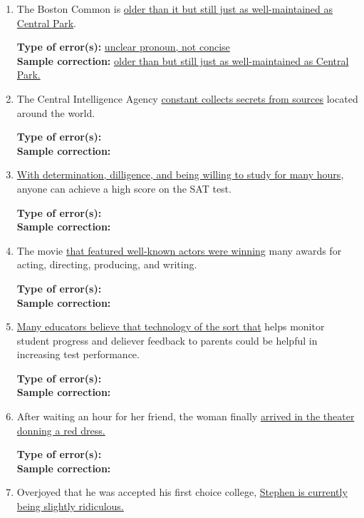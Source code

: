 \begin{enumerate}
\item The Boston Common is \ul{ older than it but still just as well-maintained as Central Park}.

\bigskip
\textbf{Type of error(s):} \ul{unclear pronoun, not concise} \\
\textbf{Sample correction:} \ul{older than but still just as well-maintained as Central Park.}

\bigskip
\item The Central Intelligence Agency \ul{constant collects secrets from sources} located around the world. 

\bigskip
\textbf{Type of error(s):} \hrulefill  \\
\textbf{Sample correction:} \hrulefill

\item \ul{With determination, dilligence, and being willing to study for many hours}, anyone can achieve a high score on the SAT test. 

\bigskip
\textbf{Type of error(s):} \hrulefill  \\
\textbf{Sample correction:} \hrulefill

\bigskip
\item The movie \ul{that featured well-known actors were winning} many awards for acting, directing, producing, and writing. 

\bigskip
\textbf{Type of error(s):} \hrulefill  \\
\textbf{Sample correction:} \hrulefill

\bigskip
\item \ul{Many educators believe that technology of the sort that} helps monitor student progress and deliever feedback to parents could be helpful in increasing test performance. 

\bigskip
\textbf{Type of error(s):} \hrulefill  \\
\textbf{Sample correction:} \hrulefill

\item After waiting an hour for her friend, the woman finally \ul{arrived in the theater donning a red dress.}

\bigskip
\textbf{Type of error(s):} \hrulefill  \\
\textbf{Sample correction:} \hrulefill

\item Overjoyed that he was accepted his first choice college, \ul{Stephen is currently being slightly ridiculous.}


\end{enumerate}

